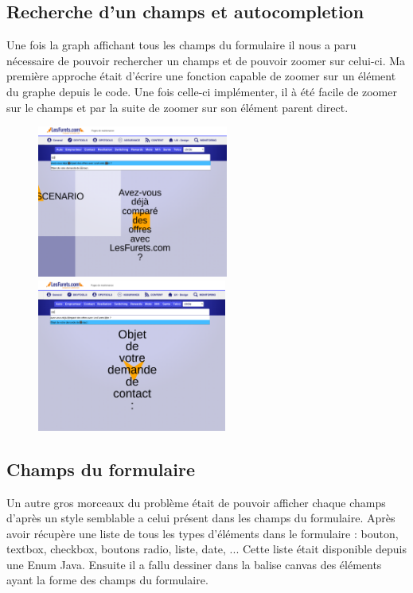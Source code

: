 \subsection{Recherche d’un champs et autocompletion}
Une fois la graph affichant tous les champs du formulaire il nous a paru nécessaire de pouvoir rechercher un champs et de pouvoir zoomer sur celui-ci. Ma première approche était d'écrire une fonction capable de zoomer sur un élément du graphe depuis le code. Une fois celle-ci implémenter, il à été facile de zoomer sur le champs et par la suite de zoomer sur son élément parent direct.
\vspace{0.5in}
\begin{figure}[!h]
\centering
\includegraphics[height=5cm]{outil/feature-search.png}
\includegraphics[height=5cm]{outil/feature-search-2.png}
\end{figure}

\subsection{Champs du formulaire}
Un autre gros morceaux du problème était de pouvoir afficher chaque champs d'après un style semblable a celui présent dans les champs du formulaire. Après avoir récupère une liste de tous les types d'éléments dans le formulaire : bouton, textbox, checkbox, boutons radio, liste, date, ... Cette liste était disponible depuis une Enum Java. Ensuite il a fallu dessiner dans la balise canvas des éléments ayant la forme des champs du formulaire.

